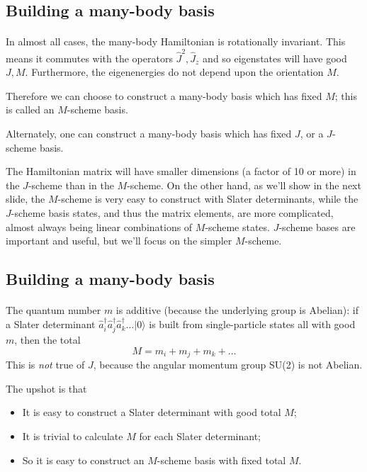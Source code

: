 \documentclass[%
twoside,                 %
final,                   %
10pt]{article}
\begin{document}
\subsection*{Building a many-body basis}

\paragraph{}
In almost all cases, the many-body Hamiltonian is rotationally invariant. This means 
it commutes with the operators $\hat{J}^2, \hat{J}_z$ and so eigenstates will have 
good $J,M$. Furthermore, the eigenenergies do not depend upon the orientation $M$. 


Therefore we can choose to construct a many-body basis which has fixed $M$; this is 
called an $M$-scheme basis. 


Alternately, one can construct a many-body basis which has fixed $J$, or a $J$-scheme 
basis. 

The Hamiltonian matrix will have smaller dimensions (a factor of 10 or more)
 in the $J$-scheme than in the $M$-scheme. 
On the other hand, as we'll show in the next slide, the $M$-scheme is very easy to 
construct with Slater determinants, while the $J$-scheme basis states, and thus the 
matrix elements, are more complicated, almost always being linear combinations of 
$M$-scheme states. $J$-scheme bases are important and useful, but we'll focus on the 
simpler $M$-scheme.




\subsection*{Building a many-body basis}

\paragraph{}
The quantum number $m$ is additive (because the underlying group is Abelian): 
if a Slater determinant $\hat{a}_i^\dagger \hat{a}^\dagger_j \hat{a}^\dagger_k \ldots | 0 \rangle$ 
is built from single-particle states all with good $m$, then the total 
\[
M = m_i + m_j + m_k + \ldots
\]
This is \emph{not} true of $J$, because the angular momentum group SU(2) is not Abelian.

The upshot is that 
\begin{itemize}
\item It is easy to construct a Slater determinant with good total $M$;

\item It is trivial to calculate $M$ for each Slater determinant;

\item So it is easy to construct an $M$-scheme basis with fixed total $M$.
\end{itemize}
\end{document}
